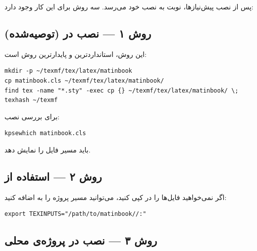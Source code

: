 پس از نصب پیش‌نیازها، نوبت به نصب خود
 می‌رسد. سه روش برای این کار
وجود دارد:

\subsection{روش ۱ — نصب در  (توصیه‌شده)}
\label{sec:installation-texmf}

این روش، استانداردترین و پایدارترین روش است:

\begin{latin}
\begin{verbatim}
mkdir -p ~/texmf/tex/latex/matinbook
cp matinbook.cls ~/texmf/tex/latex/matinbook/
find tex -name "*.sty" -exec cp {} ~/texmf/tex/latex/matinbook/ \;
texhash ~/texmf
\end{verbatim}
\end{latin}


برای بررسی نصب:

\begin{latin}
\begin{verbatim}
kpsewhich matinbook.cls
\end{verbatim}
\end{latin}

باید مسیر فایل را نمایش دهد.

\subsection{روش ۲ — استفاده از }
\label{sec:installation-texinputs}

اگر نمی‌خواهید فایل‌ها را در  کپی کنید،
می‌توانید مسیر پروژه را به  اضافه کنید:

\begin{latin}
\begin{verbatim}
export TEXINPUTS="/path/to/matinbook//:"
\end{verbatim}
\end{latin}


\subsection{روش ۳ — نصب در پروژه‌ی محلی}
\label{sec:installation-local}

